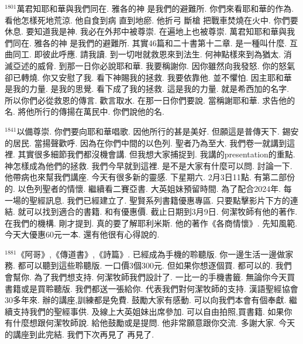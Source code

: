 \documentclass{book}
\begin{document}
$^{1801}$萬君知耶和華與我們同在.
雅各的神 是我們的避難所.
你們來看耶和華的作為.
看他怎樣死地荒涼.
他自食到病 直到地瘀.
他折弓 斷槍 把戰車焚燒在火中.
你們要休息.
要知道我是神.
我必在外邦中被尊崇.
在遍地上也被尊崇.
萬君知耶和華與我們同在.
雅各的神 是我們的避難所.
其實46篇和二十書第十二章.
是一種叫什麼.
互曲同工.
即彼此呼應.
請我讀.
到一切咁就救恩來到法生.
何神點樣來到為猶太.
消滅亞述的威脅.
到那一日你必說耶和華.
我要稱謝你.
因你雖然向我發怒.
你的怒氣卻已轉燒.
你又安慰了我.
看下神賜我的拯救.
我要依靠他.
並不懼怕.
因主耶和華是我的力量.
是我的思覺.
看下成了我的拯救.
這是我的力量.
就是希西加的名字.
所以你們必從救恩的傳言.
歡言取水.
在那一日你們要說.
當稱謝耶和華.
求告他的名.
將他所行的傳揚在萬民中.
你們說他的名.

$^{1841}$以備尊崇.
你們要向耶和華唱歌.
因他所行的甚是美好.
但願這是普傳天下.
錫安的居民.
當揚聲歡呼.
因為在你們中間的以色列.
聖者乃為至大.
我們卷一就講到這裡.
其實很多細節我們都沒機會講.
但我想大家捕捉到.
我講的presentation的重點.
神怎樣成為他們的拯救.
我們今早就到這裡.
是不是大家有什麼可以問.
討論一下.
他帶病也來幫我們講座.
今天有很多新的靈感.
下星期六.
2月3日11點.
有第二部份的.
以色列聖者的情懷.
繼續看二賽亞書.
大英姐妹預留時間.
為了配合2024年.
每一場的聖經訊息.
我們已經建立了.
聖賢系列書籍優惠專區.
只要點擊影片下方的連結.
就可以找到適合的書籍.
和有優惠價.
截止日期到3月9日.
何潔牧師有他的著作.
在我們的機構.
剛才提到.
真的要了解耶利米斯.
他的著作《各商情懷》.
先知風範.
今天大優惠60元一本.
還有他很有心得說的.

$^{1881}$《阿哥》,《傳道書》,《詩篇》.
已經成為手機的聆聽版.
你一邊生活一邊做家務.
都可以聽到這些聆聽版.
一口價3個300元.
但如果你想逐個買.
都可以的.
我們會幫你.
為了我們想支持.
何潔牧師我們設計了.
一比一的手機書籤.
無論你今天買書籍或是買聆聽版.
我們都送一張給你.
代表我們對何潔牧師的支持.
漢語聖經協會30多年來.
辦的講座,訓練都是免費.
鼓勵大家有感動.
可以向我們本會有個奉獻.
繼續支持我們的聖經事供.
及線上大英姐妹出席參加.
可以自由拍照,買書籍.
如果你有什麼想跟何潔牧師說.
給他鼓勵或是提問.
他非常願意跟你交流.
多謝大家.
今天的講座到此完結.
我們下次再見了 再見了.
\newpage
\end{document}
